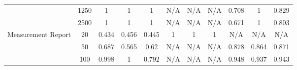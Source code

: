 \begin{table*}[]
{\begin{tabular}{ccccccccccc}
			\multicolumn{1}{|c|}{}                                            & \multicolumn{1}{c|}{1250}          & \multicolumn{1}{c|}{1}                       & \multicolumn{1}{c|}{1}                    & \multicolumn{1}{c|}{1}                & \multicolumn{1}{c|}{N/A}                      & \multicolumn{1}{c|}{N/A}                   & \multicolumn{1}{c|}{N/A}               & \multicolumn{1}{c|}{0.708}                  & \multicolumn{1}{c|}{1}                   & \multicolumn{1}{c|}{0.829}           \\ \cline{2-11}
			\multicolumn{1}{|c|}{}                                            & \multicolumn{1}{c|}{2500}          & \multicolumn{1}{c|}{1}                       & \multicolumn{1}{c|}{1}                    & \multicolumn{1}{c|}{1}                & \multicolumn{1}{c|}{N/A}                      & \multicolumn{1}{c|}{N/A}                   & \multicolumn{1}{c|}{N/A}               & \multicolumn{1}{c|}{0.671}                  & \multicolumn{1}{c|}{1}                   & \multicolumn{1}{c|}{0.803}           \\ \hline
			\multicolumn{1}{|c|}{\multirow{6}{*}{Measurement Report}}         & \multicolumn{1}{c|}{20}            & \multicolumn{1}{c|}{0.434}                   & \multicolumn{1}{c|}{0.456}                & \multicolumn{1}{c|}{0.445}            & \multicolumn{1}{c|}{1}                      & \multicolumn{1}{c|}{1}                   & \multicolumn{1}{c|}{1}               & \multicolumn{1}{c|}{N/A}                  & \multicolumn{1}{c|}{N/A}               & \multicolumn{1}{c|}{N/A}           \\ \cline{2-11}

      \multicolumn{1}{|c|}{}                                            & \multicolumn{1}{c|}{50}           & \multicolumn{1}{c|}{0.687}                   & \multicolumn{1}{c|}{0.565}                    & \multicolumn{1}{c|}{0.62}            & \multicolumn{1}{c|}{N/A}                      & \multicolumn{1}{c|}{N/A}                   & \multicolumn{1}{c|}{N/A}               & \multicolumn{1}{c|}{0.878}                  & \multicolumn{1}{c|}{0.864}               & \multicolumn{1}{c|}{0.871}           \\ \cline{2-11}


      \multicolumn{1}{|c|}{}                                            & \multicolumn{1}{c|}{100}           & \multicolumn{1}{c|}{0.998}                   & \multicolumn{1}{c|}{1}                    & \multicolumn{1}{c|}{0.792}            & \multicolumn{1}{c|}{N/A}                      & \multicolumn{1}{c|}{N/A}                   & \multicolumn{1}{c|}{N/A}               & \multicolumn{1}{c|}{0.948}                  & \multicolumn{1}{c|}{0.937}               & \multicolumn{1}{c|}{0.943}           \\ \cline{2-11}


\end{tabular}}
\end{table*}
